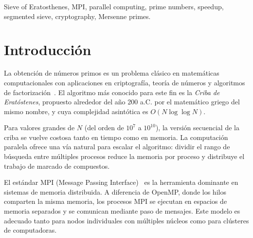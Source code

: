 \documentclass[conference]{IEEEtran}
\begin{document}
\renewcommand{\abstractname}{Abstract}
\begin{abstract}
This work presents the parallel implementation of the Sieve of Eratosthenes
using the \textit{Message Passing Interface} (MPI) standard.
The algorithm splits the search range $[2, N]$ into equal segments distributed
among the available processes; the base primes up to $\sqrt{N}$ are sent to each
process through point-to-point communication (\texttt{MPI\_Send} /
\texttt{MPI\_Recv}) and each process sieves its own segment independently.
Performance is evaluated with $N = 10{,}000{,}000$ for 1, 2 and 4 processes,
measuring the execution time with \texttt{MPI\_Wtime}. The results show a
speedup close to the ideal with 2 processes (1.997) that becomes sublinear with
4 (2.474), an expected behavior given the small problem size, where the
sequential fraction and the cost of point-to-point communication weigh more as
the number of processes grows.
\end{abstract}
\renewcommand{\IEEEkeywordsname}{Keywords}
\begin{IEEEkeywords}
Sieve of Eratosthenes, MPI, parallel computing, prime numbers, speedup,
segmented sieve, cryptography, Mersenne primes.
\end{IEEEkeywords}

\vfill
\newpage

\section{Introducción}

La obtención de números primos es un problema clásico en matemáticas
computacionales con aplicaciones en criptografía, teoría de números y
algoritmos de factorización~\cite{knuth1997}. El algoritmo más conocido para
este fin es la \textit{Criba de Eratóstenes}, propuesto alrededor del año
200 a.C. por el matemático griego del mismo nombre, y cuya complejidad
asintótica es $O(N \log \log N)$.

Para valores grandes de $N$ (del orden de $10^7$ a $10^{10}$), la versión
secuencial de la criba se vuelve costosa tanto en tiempo como en memoria.
La computación paralela ofrece una vía natural para escalar el algoritmo:
dividir el rango de búsqueda entre múltiples procesos reduce la memoria por
proceso y distribuye el trabajo de marcado de compuestos.

El estándar MPI (Message Passing Interface)~\cite{mpiforum2021} es la
herramienta dominante en sistemas de memoria distribuida. A diferencia de
OpenMP, donde los hilos comparten la misma memoria, los procesos MPI se
ejecutan en espacios de memoria separados y se comunican mediante paso de
mensajes. Este modelo es adecuado tanto para nodos individuales con múltiples
núcleos como para clústeres de computadoras.
\end{document}
